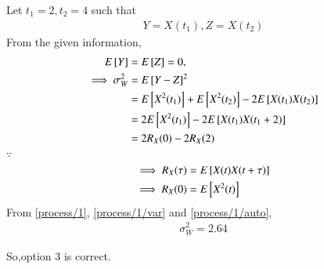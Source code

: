 Let  $t_1 =2, t_2 =4$ such that
\begin{align}
 Y = X(t_1), 
 Z = X(t_2)
\end{align}
From the given information, 
\begin{align}
    \mean{Y} &= \mean{Z} = 0, \\
    \implies 
    \sigma_W^2 & = \mean{Y-Z}^2 \\
 &= \mean{X^2(t_1)}+\mean{X^2(t_2)}-2\mean{X(t_1)X(t_2)}\\
           & = 2\mean{X^2(t_1)}-2\mean{X(t_1)X(t_1+2)}\\
           & = 2R_X(0)-2R_X(2)
           \label{process/1/var}
        \end{align}
        $\because$
        \begin{align}
            \begin{split}
            \implies R_X(\tau) & =\mean{X(t)X(t+\tau)}\\
            \implies R_X(0) & =\mean{X^2(t)}
            \end{split}
            \label{process/1/auto}
            \end{align}
        From     \eqref{process/1},  \eqref{process/1/var} and  \eqref{process/1/auto},
        \begin{align}
            \sigma_W^2        =  2.64
        \end{align}
    
So,option 3 is correct.
